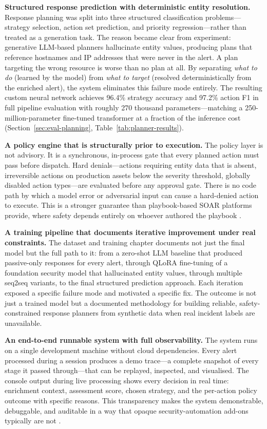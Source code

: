 \textbf{Structured response prediction with deterministic entity resolution.}
Response planning was split into three structured classification problems---strategy selection, action set prediction, and priority regression---rather than treated as a generation task. The reason became clear from experiment: generative LLM-based planners hallucinate entity values, producing plans that reference hostnames and IP addresses that were never in the alert. A plan targeting the wrong resource is worse than no plan at all. By separating \textit{what to do} (learned by the model) from \textit{what to target} (resolved deterministically from the enriched alert), the system eliminates this failure mode entirely. The resulting custom neural network achieves 96.4\% strategy accuracy and 97.2\% action F1 in full pipeline evaluation with roughly 270 thousand parameters---matching a 250-million-parameter fine-tuned transformer at a fraction of the inference cost (Section~\ref{sec:eval-planning}, Table~\ref{tab:planner-results}).

\textbf{A policy engine that is structurally prior to execution.}
The policy layer is not advisory. It is a synchronous, in-process gate that every planned action must pass before dispatch. Hard denials---actions requiring entity data that is absent, irreversible actions on production assets below the severity threshold, globally disabled action types---are evaluated before any approval gate. There is no code path by which a model error or adversarial input can cause a hard-denied action to execute. This is a stronger guarantee than playbook-based SOAR platforms provide, where safety depends entirely on whoever authored the playbook \cite{nist80061, tilbury2024humans}.

\textbf{A training pipeline that documents iterative improvement under real constraints.}
The dataset and training chapter documents not just the final model but the full path to it: from a zero-shot LLM baseline that produced passive-only responses for every alert, through QLoRA fine-tuning of a foundation security model that hallucinated entity values, through multiple seq2seq variants, to the final structured prediction approach. Each iteration exposed a specific failure mode and motivated a specific fix. The outcome is not just a trained model but a documented methodology for building reliable, safety-constrained response planners from synthetic data when real incident labels are unavailable.

\textbf{An end-to-end runnable system with full observability.}
The system runs on a single development machine without cloud dependencies. Every alert processed during a session produces a demo trace---a complete snapshot of every stage it passed through---that can be replayed, inspected, and visualised. The console output during live processing shows every decision in real time: enrichment context, assessment score, chosen strategy, and the per-action policy outcome with specific reasons. This transparency makes the system demonstrable, debuggable, and auditable in a way that opaque security-automation add-ons typically are not \cite{tilbury2024humans}.

